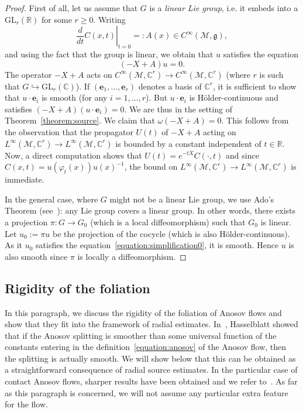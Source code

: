 \documentclass[10pt]{amsart}
\theoremstyle{definition}\newtheorem{defi}[theo]{Definition}\newtheorem{rema}[theo]{Remark}\newtheorem{exam}[theo]{Example}\newtheorem{exem}[theo]{Example}\newtheorem{nota}[theo]{Notation}
\newcommand{\C}{\mathbb{C}}
\newcommand{\R}{\mathbb{R}}
\newcommand{\bfe}{\mathbf{e}}
\newcommand{\M}{\mathcal{M}}
\newcommand{\fkg}{\mathfrak{g}}
\newcommand{\GL}{\mathrm{GL}}
\begin{document}
\begin{proof}
First of all, let us assume that $G$ is a \emph{linear Lie group}, i.e. it embeds into a $\GL_r(\R)$ for some $r \geq 0$. Writing
\[
\left. \dfrac{d}{dt} C(x,t)\right|_{t=0} =: A(x) \in C^\infty(\M,\fkg),
\]
and using the fact that the group is linear, we obtain that $u$ satisfies the equation
\begin{equation}\label{equation:simplification0}
(-X+A)u = 0.
\end{equation}
The operator $-X+A$ acts on $C^\infty(\M,\C^r) \rightarrow C^\infty(\M,\C^r)$ (where $r$ is such that $G \hookrightarrow \GL_r(\C)$). If $(\bfe_1,\dots, \bfe_r)$ denotes a basis of $\C^r$, it is sufficient to show that $u \cdot \bfe_i$ is smooth (for any $i=1,\dots,r$). But $u \cdot \bfe_i$ is H\"older-continuous and satisfies $(-X+A)(u \cdot \bfe_i) = 0$. We are thus in the setting of Theorem~\ref{theorem:source}. We claim that $\omega(-X+A)=0$. This follows from the observation that the propagator $U(t)$ of $-X+A$ acting on $L^\infty(\M,\C^r) \rightarrow L^\infty(\M,\C^r)$ is bounded by a constant independent of $t \in \R$. Now, a direct computation shows that $U(t) = e^{-tX} C(\cdot,t)$ and since $C(x,t) = u(\varphi_t (x))u(x)^{-1}$, the bound on $L^\infty(\M,\C^r) \rightarrow L^\infty(\M,\C^r)$ is immediate.


In the general case, where $G$ might not be a linear Lie group, we use Ado's Theorem (see~\cite[Conclusion 5.26]{Hall-15}): any Lie group covers a linear group. In other words, there exists a projection $\pi : G \rightarrow G_0$ (which is a local diffeomorphism) such that $G_0$ is linear. Let $u_0 := \pi u$ be the projection of the cocycle (which is also H\"older-continuous). As it $u_0$ satisfies the equation~\eqref{equation:simplification0}, it is smooth. Hence $u$ is also smooth since $\pi$ is locally a diffeomorphism.
\end{proof}



\subsection{Rigidity of the foliation}

In this paragraph, we discuss the rigidity of the foliation of Anosov flows and show that they fit into the framework of radial estimates. In~\cite{Hasselblatt-92}, Hasselblatt showed that if the Anosov splitting is smoother than some universal function of the constants entering in the definition~\eqref{equation:anosov} of the Anosov flow, then the splitting is actually smooth. We will show below that this can be obtained as a straightforward consequence of radial source estimates. In the particular case of contact Anosov flows, sharper results have been obtained and we refer to~\cite{Benoist-Foulon-Labourie-90, Benoist-Foulon-Labourie-92,Hurder-Katok-90}. As far as this paragraph is concerned, we will not assume any particular extra feature for the flow.
\end{document}
